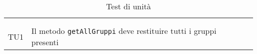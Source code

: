 \begin{center}
  {	    %
    \renewcommand{\arraystretch}{1.60}
    \begin{longtable}{
      |>{\centering\arraybackslash}p{48pt}
      |>{\centering\arraybackslash}p{308pt}
      |>{\centering\arraybackslash}p{27pt}|}

      \rowcolor{antimaincolor!0}
      \caption{\label{tab:Test di unita}Test di unità}

      \\

      \hline
      \rowcolor{maincolor}
      \color{antimaincolor}{Codice}
                  &
      \color{antimaincolor}{Descrizione}
                  &

      \color{antimaincolor}{Esito}

      \\
      \hline
      \endhead

      \hline
      \rowcolor{maincolor}
      \color{antimaincolor}{Codice}
                  &
      \color{antimaincolor}{Descrizione}
                  &

      \color{antimaincolor}{Esito}

      \\
      \hline
      \endfoot

      TU1
                  & Il metodo \texttt{getAllGruppi}
      deve restituire tutti i gruppi presenti


\end{longtable}}
\end{center}
